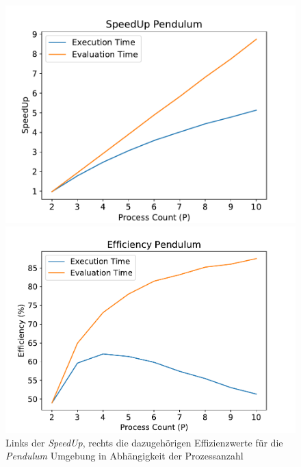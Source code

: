\begin{figure}[!h]
	\centering
	\begin{minipage}[]{0.49\textwidth}
		\includegraphics[width=1.0\textwidth]{./img/pendulum_analysis/pendulum_speedup1_2_10.pdf} 
	\end{minipage}
	\hfill
	\begin{minipage}[]{0.49\textwidth}
		\includegraphics[width=1.0\textwidth]{./img/pendulum_analysis/efficiency_pendulum_2_10.pdf} 
	\end{minipage}
	\caption{Links der \emph{SpeedUp}, rechts die dazugehörigen Effizienzwerte für die \emph{Pendulum} Umgebung in Abhängigkeit der Prozessanzahl}
	\label{fig:mountain_car_2_10_efficiency_speedup}
\end{figure}

